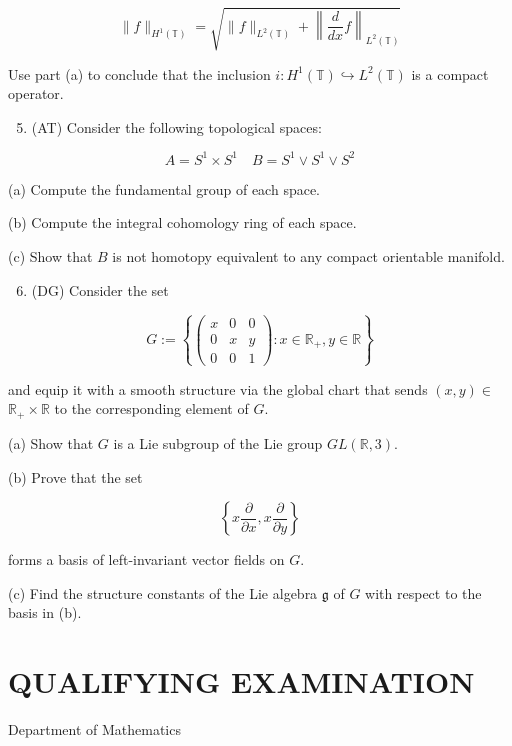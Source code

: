 \documentclass[10pt]{article}
\begin{document}
$$
\|f\|_{H^{1}(\mathbb{T})}=\sqrt{\|f\|_{L^{2}(\mathbb{T})}+\left\|\frac{d}{d x} f\right\|_{L^{2}(\mathbb{T})}}
$$

Use part (a) to conclude that the inclusion $i: H^{1}(\mathbb{T}) \hookrightarrow L^{2}(\mathbb{T})$ is a compact operator.

\begin{enumerate}
  \setcounter{enumi}{4}
  \item (AT) Consider the following topological spaces:
\end{enumerate}

$$
A=S^{1} \times S^{1} \quad B=S^{1} \vee S^{1} \vee S^{2}
$$

(a) Compute the fundamental group of each space.

(b) Compute the integral cohomology ring of each space.

(c) Show that $B$ is not homotopy equivalent to any compact orientable manifold.

\begin{enumerate}
  \setcounter{enumi}{5}
  \item (DG) Consider the set
\end{enumerate}

$$
G:=\left\{\left(\begin{array}{ccc}
x & 0 & 0 \\
0 & x & y \\
0 & 0 & 1
\end{array}\right): x \in \mathbb{R}_{+}, y \in \mathbb{R}\right\}
$$

and equip it with a smooth structure via the global chart that sends $(x, y) \in$ $\mathbb{R}_{+} \times \mathbb{R}$ to the corresponding element of $G$.

(a) Show that $G$ is a Lie subgroup of the Lie group $G L(\mathbb{R}, 3)$.

(b) Prove that the set

$$
\left\{x \frac{\partial}{\partial x}, x \frac{\partial}{\partial y}\right\}
$$

forms a basis of left-invariant vector fields on $G$.

(c) Find the structure constants of the Lie algebra $\mathfrak{g}$ of $G$ with respect to the basis in (b).

\section*{QUALIFYING EXAMINATION }
Department of Mathematics
\end{document}

